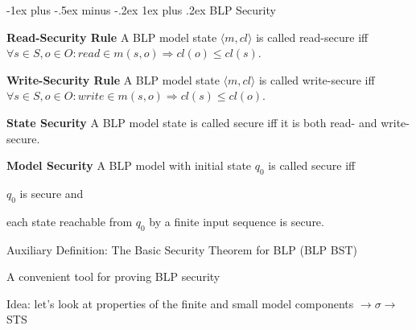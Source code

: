 \documentclass[a4paper]{article}
\makeatletter
\renewcommand{\note}[2]{\begin{noteBox} \textbf{#1} #2 \end{noteBox}}
\renewcommand{\subsubsection}{\@startsection{subsubsection}{3}{0mm}%
                                {-1ex plus -.5ex minus -.2ex}%
                                {1ex plus .2ex}%
                                {\normalfont\small\bfseries}}
\makeatother
\begin{document}
\begin{multicols}{3}
    \subsubsection{BLP Security}
    \note{Read-Security Rule}{A BLP model state $\langle m,cl\rangle$ is called read-secure iff $\forall s\in S,o\in O:read\in m(s,o)\Rightarrow cl(o) \leq cl(s)$.}

    \note{Write-Security Rule}{A BLP model state $\langle m,cl\rangle$ is called write-secure iff $\forall s\in S,o\in O:write\in m(s,o)\Rightarrow cl(s)\leq cl(o)$.}

    \note{State Security}{A BLP model state is called secure iff it is both read- and write-secure.}

    \note{Model Security}{A BLP model with initial state $q_0$ is called secure iff
        \begin{enumerate*}
            \item $q_0$ is secure and
            \item each state reachable from $q_0$ by a finite input sequence is secure.
        \end{enumerate*}
    }

    Auxiliary Definition: The Basic Security Theorem for BLP (BLP BST)
    \begin{itemize*}
        \item A convenient tool for proving BLP security
        \item Idea: let’s look at properties of the finite and small model components $\rightarrow\sigma\rightarrow$ STS
    \end{itemize*}


\end{multicols}
\end{document}

